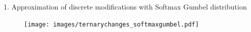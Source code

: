 \documentclass[10pt]{beamer}
\DeclareMathOperator*{\argmax}{arg\,max}
\begin{document}
    
             
    


\begin{frame}{1. Approximation of discrete modifications with Softmax Gumbel distribution}
    \begin{figure}[h]
        \texttt{[image: images/ternarychanges\_softmaxgumbel.pdf]}
    \end{figure}
\end{frame}
\end{document}

